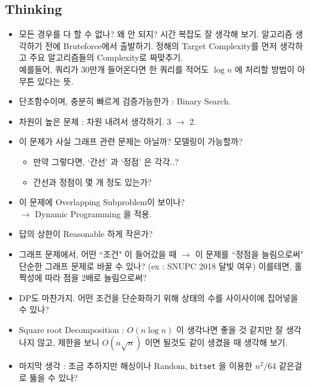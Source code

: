 \documentclass[landscape,8pt]{article}
\begin{document}
\begin{multicols}{2}
  \subsection{Thinking}
    \begin{itemize}
      \item 모든 경우를 다 할 수 없나? 왜 안 되지? 시간 복잡도 잘 생각해 보기. 알고리즘 생각하기 전에 Bruteforce에서 출발하기. 정해의 Target Complexity를 먼저 생각하고 주요 알고리즘들의 Complexity로 짜맞추기.\\
      예를들어, 쿼리가 30만개 들어온다면 한 쿼리를 적어도 $\log{n}$ 에 처리할 방법이 아무튼 있다는 뜻.
      \item 단조함수이며, 충분히 빠르게 검증가능한가 : Binary Search.
      \item 차원이 높은 문제 : 차원 내려서 생각하기. 3 $\rightarrow$ 2.
      \item 이 문제가 사실 그래프 관련 문제는 아닐까? 모델링이 가능할까?
          \begin{itemize}
            \item 만약 그렇다면, `간선' 과 `정점' 은 각각..?
            \item 간선과 정점이 몇 개 정도 있는가?
          \end{itemize}
      \item 이 문제에 Overlapping Subproblem이 보이나? \\$\rightarrow$ Dynamic Programming 을 적용.
      \item 답의 상한이 Reasonable 하게 작은가?
      \item 그래프 문제에서, 어떤 ``조건" 이 들어갔을 때 $\to$ 이 문제를 ``정점을 늘림으로써" 단순한 그래프 문제로 바꿀 수 있나? (ex : SNUPC 2018 달빛 여우) 이를테면, 홀짝성에 따라 점을 2배로 늘림으로써?
      \item DP도 마찬가지. 어떤 조건을 단순화하기 위해 상태의 수를 사이사이에 집어넣을 수 있나?
      \item Square root Decomposition : $O(n \log n)$ 이 생각나면 좋을 것 같지만 잘 생각나지 않고, 제한을 보니 $O(n \sqrt{n})$ 이면 될것도 같이 생겼을 때 생각해 보기.
      \item 마지막 생각 : 조금 추하지만 해싱이나 Random, \texttt{bitset} 을 이용한 $n^2 / 64$ 같은걸로 뚫을 수 있나?
    \end{itemize}
\newpage

\end{multicols}
\end{document}
